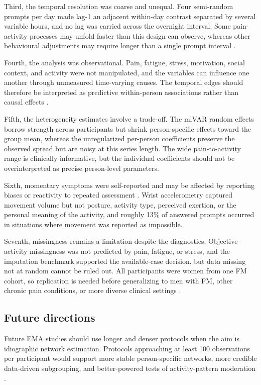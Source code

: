\documentclass[11pt,a4paper]{article}
\begin{document}
Third, the temporal resolution was coarse and unequal. Four semi-random prompts per day made
lag-1 an adjacent within-day contrast separated by several variable hours, and no lag was
carried across the overnight interval. Some pain-activity processes may unfold faster than
this design can observe, whereas other behavioural adjustments may require longer than a
single prompt interval \citep{hamaker2017no}.

Fourth, the analysis was observational. Pain, fatigue, stress, motivation, social context, and
activity were not manipulated, and the variables can influence one another through unmeasured
time-varying causes. The temporal edges should therefore be interpreted as predictive
within-person associations rather than causal effects \citep{rohrer2018thinking}.

Fifth, the heterogeneity estimates involve a trade-off. The mlVAR random effects borrow
strength across participants but shrink person-specific effects toward the group mean,
whereas the unregularized per-person coefficients preserve the observed spread but are noisy
at this series length. The wide pain-to-activity range is clinically informative, but the
individual coefficients should not be overinterpreted as precise person-level parameters.

Sixth, momentary symptoms were self-reported and may be affected by reporting biases or
reactivity to repeated assessment \citep{shiffman2008ecological}. Wrist accelerometry
captured movement volume but not posture, activity type, perceived exertion, or the personal
meaning of the activity, and roughly 13\% of answered prompts occurred in situations where
movement was reported as impossible.

Seventh, missingness remains a limitation despite the diagnostics. Objective-activity
missingness was not predicted by pain, fatigue, or stress, and the imputation benchmark
supported the available-case decision, but data missing not at random cannot be ruled out.
All participants were women from one FM cohort, so replication is needed before generalizing
to men with FM, other chronic pain conditions, or more diverse clinical settings
\citep{hauser2015fibromyalgia}.

\subsection{Future directions}
Future EMA studies should use longer and denser protocols when the aim is idiographic
network estimation. Protocols approaching at least 100 observations per participant would
support more stable person-specific networks, more credible data-driven subgrouping, and
better-powered tests of activity-pattern moderation \citep{wright2020personalized,
beltz2016bridging}.
\end{document}
